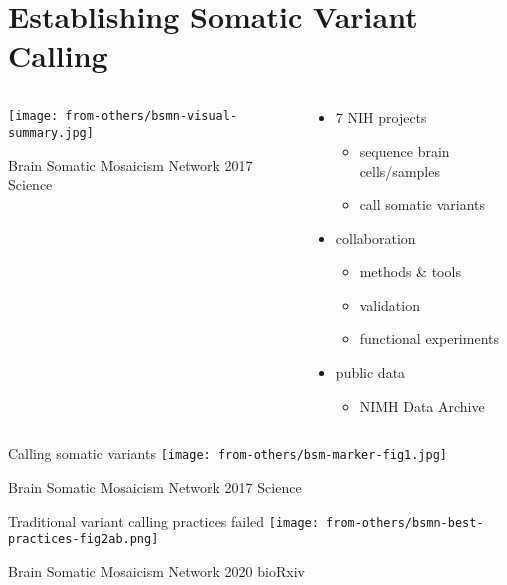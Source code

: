 \documentclass[usenames,dvipsnames]{beamer}
\begin{document}
\section{Establishing Somatic Variant Calling} 
\begin{frame}
\begin{columns}[t]
\begin{column}{0.6\textwidth}

\texttt{[image: from-others/bsmn-visual-summary.jpg]}

{\tiny Brain Somatic Mosaicism Network 2017 Science}
\end{column}

\begin{column}{0.4\textwidth}
\begin{itemize}
\item 7 NIH projects
	\begin{itemize}
	\item sequence brain cells/samples
	\item call somatic variants
	\end{itemize}
\item collaboration
	\begin{itemize}
	\item methods \& tools 
        \item validation
        \item functional experiments
	\end{itemize}
\item public data
	\begin{itemize}
		\item NIMH Data Archive
	\end{itemize}
\end{itemize}
\end{column}
\end{columns}
\end{frame}

\begin{frame}{Calling somatic variants}
\texttt{[image: from-others/bsm-marker-fig1.jpg]}

{\tiny Brain Somatic Mosaicism Network 2017 Science}
\end{frame}

\begin{frame}{Traditional variant calling practices failed}
\texttt{[image: from-others/bsmn-best-practices-fig2ab.png]}

{\tiny Brain Somatic Mosaicism Network 2020 bioRxiv}
\end{frame}
\end{document}
